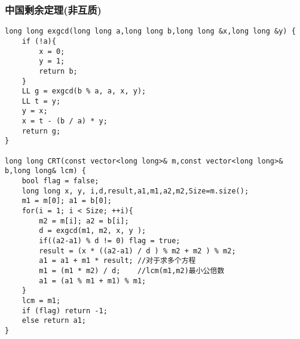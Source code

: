\subsubsection{中国剩余定理(非互质)}
\begin{verbatim}
long long exgcd(long long a,long long b,long long &x,long long &y) {
	if (!a){
		x = 0;
		y = 1;
		return b;
	}
	LL g = exgcd(b % a, a, x, y);
	LL t = y;
	y = x;
	x = t - (b / a) * y;
    return g;
}

long long CRT(const vector<long long>& m,const vector<long long>& b,long long& lcm) {
    bool flag = false;
    long long x, y, i,d,result,a1,m1,a2,m2,Size=m.size();
    m1 = m[0]; a1 = b[0];
    for(i = 1; i < Size; ++i){
        m2 = m[i]; a2 = b[i];
        d = exgcd(m1, m2, x, y );
        if((a2-a1) % d != 0) flag = true;
        result = (x * ((a2-a1) / d ) % m2 + m2 ) % m2;
        a1 = a1 + m1 * result; //对于求多个方程
        m1 = (m1 * m2) / d;    //lcm(m1,m2)最小公倍数
        a1 = (a1 % m1 + m1) % m1;
    }
    lcm = m1;
    if (flag) return -1;
    else return a1;
}
\end{verbatim}
